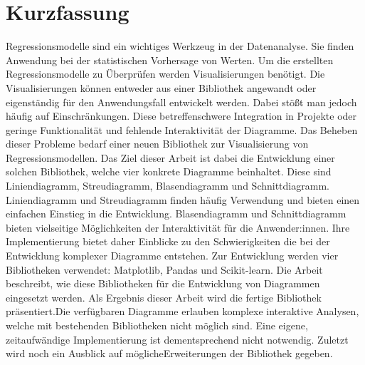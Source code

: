 \chapter{Kurzfassung}

Regressionsmodelle sind ein wichtiges Werkzeug in der Datenanalyse. Sie finden Anwendung bei der statistischen Vorhersage von Werten. Um die erstellten Regressionsmodelle zu Überprüfen werden Visualisierungen benötigt. Die Visualisierungen können entweder aus einer Bibliothek angewandt oder eigenständig für den Anwendungsfall entwickelt werden. Dabei stößt man jedoch häufig auf Einschränkungen. Diese betreffen\linebreak schwere Integration in Projekte oder geringe Funktionalität und fehlende Interaktivität der Diagramme. Das Beheben dieser Probleme bedarf einer neuen Bibliothek zur Visualisierung von Regressionsmodellen. Das Ziel dieser Arbeit ist dabei die Entwicklung einer solchen Bibliothek, welche vier konkrete Diagramme beinhaltet. Diese sind Liniendiagramm, Streudiagramm, Blasendiagramm und Schnittdiagramm. Liniendiagramm und Streudiagramm finden häufig Verwendung und bieten einen einfachen Einstieg in die Entwicklung. Blasendiagramm und Schnittdiagramm bieten vielseitige Möglichkeiten der Interaktivität für die Anwender:innen. Ihre Implementierung bietet daher Einblicke zu den Schwierigkeiten die bei der Entwicklung komplexer Diagramme entstehen. Zur Entwicklung werden vier Bibliotheken verwendet: Matplotlib, Pandas und Scikit-learn. Die Arbeit beschreibt, wie diese Bibliotheken für die Entwicklung von Diagrammen eingesetzt werden. Als Ergebnis dieser Arbeit wird die fertige Bibliothek präsentiert.\linebreak Die verfügbaren Diagramme erlauben komplexe interaktive Analysen, welche mit bestehenden Bibliotheken nicht möglich sind. Eine eigene, zeitaufwändige Implementierung ist dementsprechend nicht notwendig. Zuletzt wird noch ein Ausblick auf mögliche\linebreak Erweiterungen der Bibliothek gegeben.